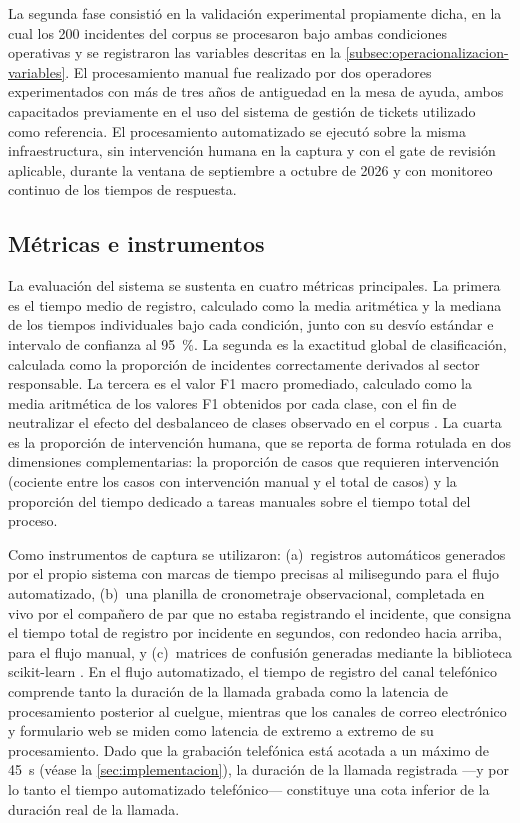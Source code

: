 La segunda fase consistió en la validación experimental propiamente dicha, en la cual los 200 incidentes del corpus se procesaron bajo ambas condiciones operativas y se registraron las variables descritas en la \autoref{subsec:operacionalizacion-variables}. El procesamiento manual fue realizado por dos operadores experimentados con más de tres años de antiguedad en la mesa de ayuda, ambos capacitados previamente en el uso del sistema de gestión de tickets utilizado como referencia. El procesamiento automatizado se ejecutó sobre la misma infraestructura, sin intervención humana en la captura y con el gate de revisión aplicable, durante la ventana de septiembre a octubre de 2026 y con monitoreo continuo de los tiempos de respuesta.

\subsection{Métricas e instrumentos}\label{subsec:metricas-instrumentos}

La evaluación del sistema se sustenta en cuatro métricas principales. La primera es el tiempo medio de registro, calculado como la media aritmética y la mediana de los tiempos individuales bajo cada condición, junto con su desvío estándar e intervalo de confianza al 95~\%. La segunda es la exactitud global de clasificación, calculada como la proporción de incidentes correctamente derivados al sector responsable. La tercera es el valor F1 macro promediado, calculado como la media aritmética de los valores F1 obtenidos por cada clase, con el fin de neutralizar el efecto del desbalanceo de clases observado en el corpus \parencite{Sokolova2009_performance_measures}. La cuarta es la proporción de intervención humana, que se reporta de forma rotulada en dos dimensiones complementarias: la proporción de casos que requieren intervención (cociente entre los casos con intervención manual y el total de casos) y la proporción del tiempo dedicado a tareas manuales sobre el tiempo total del proceso.

Como instrumentos de captura se utilizaron: (a)~registros automáticos generados por el propio sistema con marcas de tiempo precisas al milisegundo para el flujo automatizado, (b)~una planilla de cronometraje observacional, completada en vivo por el compañero de par que no estaba registrando el incidente, que consigna el tiempo total de registro por incidente en segundos, con redondeo hacia arriba, para el flujo manual, y (c)~matrices de confusión generadas mediante la biblioteca scikit-learn \parencite{Pedregosa2011_scikit_learn}. En el flujo automatizado, el tiempo de registro del canal telefónico comprende tanto la duración de la llamada grabada como la latencia de procesamiento posterior al cuelgue, mientras que los canales de correo electrónico y formulario web se miden como latencia de extremo a extremo de su procesamiento. Dado que la grabación telefónica está acotada a un máximo de 45~s (véase la \autoref{sec:implementacion}), la duración de la llamada registrada ---y por lo tanto el tiempo automatizado telefónico--- constituye una cota inferior de la duración real de la llamada.

